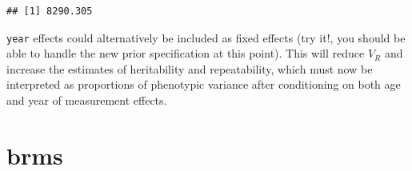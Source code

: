 \documentclass[
  12pt,
]{book}
\newenvironment{Shaded}{\begin{snugshade}}{\end{snugshade}}
\newcommand{\DataTypeTok}[1]{\textcolor[rgb]{0.13,0.29,0.53}{#1}}
\newcommand{\DecValTok}[1]{\textcolor[rgb]{0.00,0.00,0.81}{#1}}
\newcommand{\FloatTok}[1]{\textcolor[rgb]{0.00,0.00,0.81}{#1}}
\newcommand{\KeywordTok}[1]{\textcolor[rgb]{0.13,0.29,0.53}{\textbf{#1}}}
\newcommand{\NormalTok}[1]{#1}
\newcommand{\OperatorTok}[1]{\textcolor[rgb]{0.81,0.36,0.00}{\textbf{#1}}}
\newcommand{\StringTok}[1]{\textcolor[rgb]{0.31,0.60,0.02}{#1}}
\begin{document}
\begin{Shaded}
\end{Shaded}

\begin{verbatim}
## [1] 8290.305
\end{verbatim}

\texttt{year} effects could alternatively be included as fixed effects (try it!, you should be able to handle the new prior specification at this point). This will reduce \(V_R\) and increase the estimates of heritability and repeatability, which must now be interpreted as proportions of phenotypic variance after conditioning on both age and year of measurement effects.

\hypertarget{brms-3}{%
\section{brms}\label{brms-3}}

\begin{Shaded}
\end{Shaded}
\end{document}
